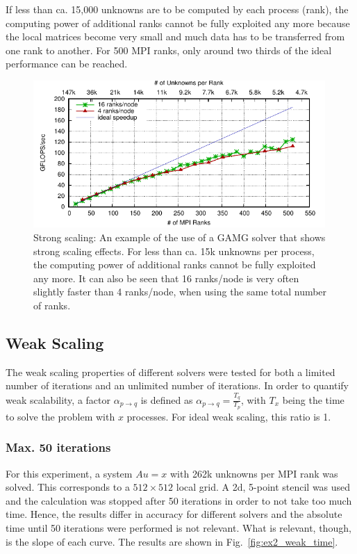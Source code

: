 If less than ca. 15,000 unknowns are to be computed by each process (rank), the computing power of additional ranks cannot be fully exploited any more because the local matrices become very small and much data has to be transferred from one rank to another. For 500 MPI ranks, only around two thirds of the ideal performance can be reached. 


\begin{figure}[tb]
	\centering
	\includegraphics[width=0.99\textwidth]{ex48}
	\caption{Strong scaling: An example of the use of a GAMG solver that shows strong scaling effects. For less than ca. 15k unknowns per process, the computing power of additional ranks cannot be fully exploited any more. It can also be seen that 16 ranks/node is very often slightly faster than 4 ranks/node, when using the same total number of ranks.} 
	\label{fig:res_ex48}
\end{figure}



\subsection{Weak Scaling}

The weak scaling properties of different solvers were tested for both a limited number of iterations and an unlimited number of iterations. In order to quantify weak scalability, a factor $\alpha_{p \rightarrow q}$ is defined as $\alpha_{p \rightarrow q} = \frac{T_q}{T_p}$, with $T_x$ being the time to solve the problem with $x$ processes. For ideal weak scaling, this ratio is 1. 

\subsubsection*{Max. 50 iterations}

For this experiment, a system $Au = x$ with 262k unknowns per MPI rank was solved. This corresponds to a $512 \times 512$ local grid. A 2d, 5-point stencil was used and the calculation was stopped after 50 iterations in order to not take too much time. Hence, the results differ in accuracy for different solvers and the absolute time until 50 iterations were performed is not relevant. What is relevant, though, is the slope of each curve. The results are shown in Fig.~\ref{fig:ex2_weak_time}. 

